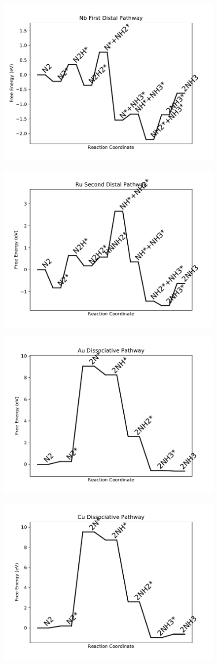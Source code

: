 \documentclass[journal=jacsat,manuscript=article]{achemso}
\begin{document}
\begin{figure}
\includegraphics[width=0.5\linewidth]{data/plots/Nb_distal_1.pdf}
\label{fig:Nb_distal_1}
\end{figure}

\newpage
\begin{figure}
\includegraphics[width=0.5\linewidth]{data/plots/Ru_distal_2.pdf}
\label{fig:Ru_distal_2}
\end{figure}

\begin{figure}
\includegraphics[width=0.5\linewidth]{data/plots/Au_dissociative.pdf}
\label{fig:Au_dissociative}
\end{figure}

\newpage
\begin{figure}
\includegraphics[width=0.5\linewidth]{data/plots/Cu_dissociative.pdf}
\label{fig:Cu_dissociative}
\end{figure}
\end{document}
